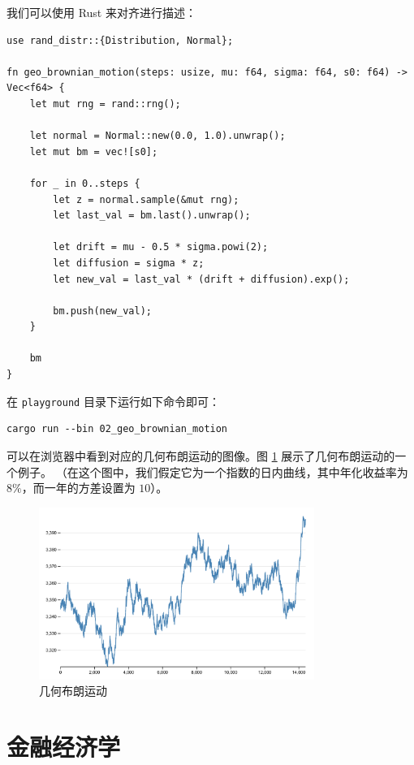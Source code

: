 \documentclass[utf8,a4paper,nofonts,9pt]{ctexbook}
\begin{document}
我们可以使用 Rust 来对齐进行描述：

\begin{lstlisting}
use rand_distr::{Distribution, Normal};

fn geo_brownian_motion(steps: usize, mu: f64, sigma: f64, s0: f64) -> Vec<f64> {
    let mut rng = rand::rng();

    let normal = Normal::new(0.0, 1.0).unwrap();
    let mut bm = vec![s0];

    for _ in 0..steps {
        let z = normal.sample(&mut rng);
        let last_val = bm.last().unwrap();

        let drift = mu - 0.5 * sigma.powi(2);
        let diffusion = sigma * z;
        let new_val = last_val * (drift + diffusion).exp();

        bm.push(new_val);
    }

    bm
}
\end{lstlisting}

在 \verb|playground| 目录下运行如下命令即可：

\begin{lstlisting}
cargo run --bin 02_geo_brownian_motion
\end{lstlisting}

可以在浏览器中看到对应的几何布朗运动的图像。图 \ref{fig:geoBrownianMotion} 展示了几何布朗运动的一个例子。
（在这个图中，我们假定它为一个指数的日内曲线，其中年化收益率为 $8\%$，而一年的方差设置为 $10$）。

\begin{figure}[h]
    \centering
    \includegraphics[width=0.8\textwidth]{src/static/01_geo_brownian_motion.png}
    \caption{几何布朗运动}
    \label{fig:geoBrownianMotion}
\end{figure}

\chapter{金融经济学}
\end{document}
